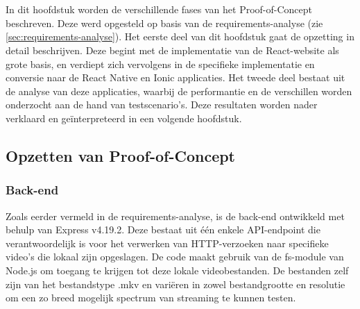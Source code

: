 \chapter{}%
\label{ch:proof-of-concept}



In dit hoofdstuk worden de verschillende fases van het Proof-of-Concept beschreven. Deze werd opgesteld op basis van de requirements-analyse (zie \ref{sec:requirements-analyse}). Het eerste deel van dit hoofdstuk gaat de opzetting in detail beschrijven. Deze begint met de implementatie van de React-website als grote basis, en verdiept zich vervolgens in de specifieke implementatie en conversie naar de React Native en Ionic applicaties. Het tweede deel bestaat uit de analyse van deze applicaties, waarbij de performantie en de verschillen worden onderzocht aan de hand van testscenario's. Deze resultaten worden nader verklaard en geïnterpreteerd in een volgende hoofdstuk.


\section{Opzetten van Proof-of-Concept}
\label{sec:opzetten-proof-of-concept}

\subsection{Back-end}
\label{subsec:back-end}

Zoals eerder vermeld in de requirements-analyse, is de back-end ontwikkeld met behulp van Express v4.19.2. Deze bestaat uit één enkele API-endpoint die verantwoordelijk is voor het verwerken van HTTP-verzoeken naar specifieke video's die lokaal zijn opgeslagen. De code maakt gebruik van de fs-module van Node.js om toegang te krijgen tot deze lokale videobestanden. De bestanden zelf zijn van het bestandstype .mkv en variëren in zowel bestandgrootte en resolutie om een zo breed mogelijk spectrum van streaming te kunnen testen.

